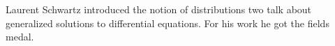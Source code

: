 
%
%
%
%
	
	Laurent Schwartz introduced the notion of distributions two talk about generalized solutions to differential equations. For his work he got the fields medal. 
